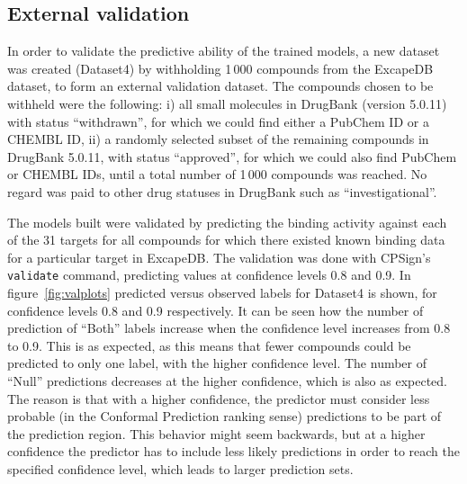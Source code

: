 \documentclass[utf8]{frontiersSCNS} %
\begin{document}
\subsection*{External validation}

In order to validate the predictive ability of the trained models, a new
dataset was created (Dataset4) by withholding 1\,000 compounds from the
ExcapeDB dataset, to form an external validation dataset. The compounds chosen
to be withheld were the following: i) all small molecules in DrugBank (version
5.0.11) with status ``withdrawn'', for which we could find either a PubChem ID
or a CHEMBL ID, ii) a randomly selected subset of the remaining compounds in
DrugBank 5.0.11, with status ``approved'', for which we could also find PubChem
or CHEMBL IDs, until a total number of 1\,000 compounds was reached.  No regard
was paid to other drug statuses in DrugBank such as ``investigational''.

The models built were validated by predicting the binding activity against each
of the 31 targets for all compounds for which there existed known binding data
for a particular target in ExcapeDB. The validation was done with CPSign's
\texttt{validate} command, predicting values at confidence levels 0.8 and 0.9.
%
In figure~\ref{fig:valplots} predicted versus observed labels for Dataset4 is
shown, for confidence levels 0.8 and 0.9 respectively. It can be seen how the
number of prediction of ``Both'' labels increase when the confidence level
increases from 0.8 to 0.9. This is as expected, as this means that fewer
compounds could be predicted to only one label, with the higher confidence
level. The number of ``Null'' predictions decreases at the higher confidence,
which is also as expected. The reason is that with a higher confidence, the
predictor must consider less probable (in the Conformal Prediction ranking
sense) predictions to be part of the prediction region. This behavior might seem
backwards, but at a higher confidence the predictor has to include less likely
predictions in order to reach the specified confidence level, which leads to
larger prediction sets.
\end{document}
